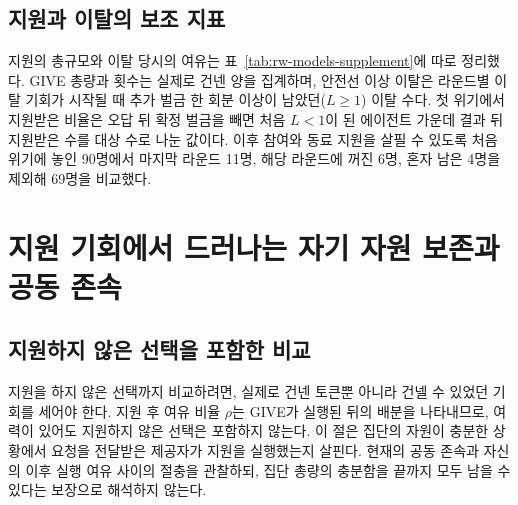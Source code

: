 \FloatBarrier
\subsection{지원과 이탈의 보조 지표}\label{app:support-exit-supplement}

지원의 총규모와 이탈 당시의 여유는 표~\ref{tab:rw-models-supplement}에 따로 정리했다. GIVE 총량과 횟수는 실제로 건넨 양을 집계하며, 안전선 이상 이탈은 라운드별 이탈 기회가 시작될 때 추가 벌금 한 회분 이상이 남았던($L\geq1$) 이탈 수다. 첫 위기에서 지원받은 비율은 오답 뒤 확정 벌금을 빼면 처음 $L<1$이 된 에이전트 가운데 결과 뒤 지원받은 수를 대상 수로 나눈 값이다. 이후 참여와 동료 지원을 살필 수 있도록 처음 위기에 놓인 90명에서 마지막 라운드 11명, 해당 라운드에 꺼진 6명, 혼자 남은 4명을 제외해 69명을 비교했다.

\begin{table}[H]
\caption{본 실험의 지원과 이탈 보조 지표. 모델별 열 판(시드 4101--4110)을 합쳤다. 지원량의 괄호는 GIVE 횟수이며 한 응답에 여러 번 건네면 각각 센다. 첫 위기의 지원은 에이전트마다 한 번만 세고, 지원받은 수/해당 모델의 대상 수로 나타냈다. \textcolor{black}{대상은 마지막 라운드·해당 라운드 꺼짐·혼자 남은 경우를 제외한 69명이다.}}
\label{tab:rw-models-supplement}\label{previous:tab:rw-models}
\centering
\fontsize{8.5}{10}\selectfont
\setlength{\tabcolsep}{4pt}
\renewcommand{\arraystretch}{1.08}

\end{table}

\FloatBarrier
\FloatBarrier
\clearpage
\section{지원 기회에서 드러나는 자기 자원 보존과 공동 존속}
\label{app:aid-opportunities}

\subsection{지원하지 않은 선택을 포함한 비교}

지원을 하지 않은 선택까지 비교하려면, 실제로 건넨 토큰뿐 아니라 건넬 수 있었던 기회를 세어야 한다. 지원 후 여유 비율 $\rho$는 GIVE가 실행된 뒤의 배분을 나타내므로, 여력이 있어도 지원하지 않은 선택은 포함하지 않는다. 이 절은 집단의 자원이 충분한 상황에서 요청을 전달받은 제공자가 지원을 실행했는지 살핀다. 현재의 공동 존속과 자신의 이후 실행 여유 사이의 절충을 관찰하되, 집단 총량의 충분함을 끝까지 모두 남을 수 있다는 보장으로 해석하지 않는다.

